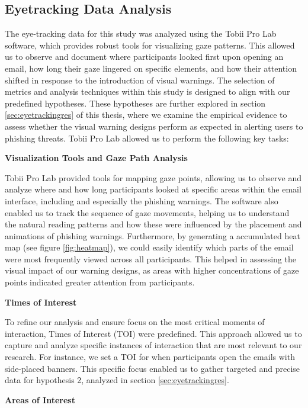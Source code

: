 \documentclass[
  a4paper,  %
  twoside,  %
  bibliography=totoc,
  headsepline,
  cleardoublepage=empty,
  parskip=half,
  draft=false
]{scrbook}
\begin{document}
\subsection{Eyetracking Data Analysis} 
The eye-tracking data for this study was analyzed using the Tobii Pro Lab software, which provides robust tools for visualizing gaze patterns. This allowed us to observe and document where participants looked first upon opening an email, how long their gaze lingered on specific elements, and how their attention shifted in response to the introduction of visual warnings. 
The selection of metrics and analysis techniques within this study is designed to align with our predefined hypotheses. These hypotheses are further explored in section \ref{sec:eyetrackingres} of this thesis, where we examine the empirical evidence to assess whether the visual warning designs perform as expected in alerting users to phishing threats. Tobii Pro Lab allowed us to perform the following key tasks:

\textbf{Visualization Tools and Gaze Path Analysis}

Tobii Pro Lab provided tools for mapping gaze points, allowing us to observe and analyze where and how long participants looked at specific areas within the email interface, including and especially the phishing warnings. The software also enabled us to track the sequence of gaze movements, helping us to understand the natural reading patterns and how these were influenced by the placement and animations of phishing warnings.
Furthermore, by generating a accumulated heat map (see figure \ref{fig:heatmap}), we could easily identify which parts of the email were most frequently viewed across all participants. This helped in assessing the visual impact of our warning designs, as areas with higher concentrations of gaze points indicated greater attention from participants. \newpage

\textbf{Times of Interest}

To refine our analysis and ensure focus on the most critical moments of interaction, Times of Interest (TOI) were predefined. This approach allowed us to capture and analyze specific instances of interaction that are most relevant to our research. For instance, we set a TOI for when participants open the emails with side-placed banners. This specific focus enabled us to gather targeted and precise data for hypothesis 2, analyzed in section \ref{sec:eyetrackingres}.

\textbf{Areas of Interest}
\end{document}
